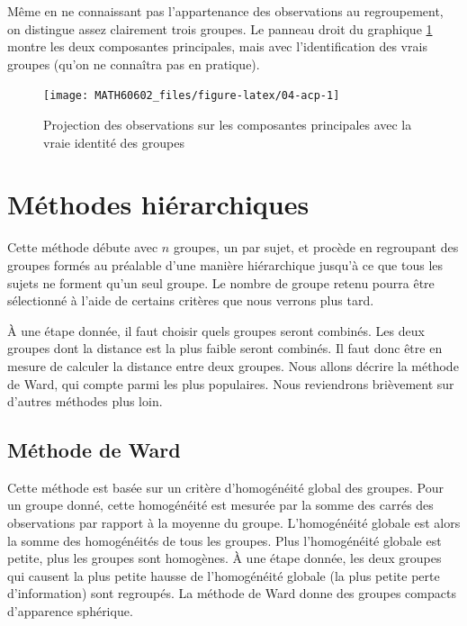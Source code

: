 \documentclass[
  11pt,
  letterpaper,
]{book}
\theoremstyle{definition}
\theoremstyle{definition}
\theoremstyle{definition}
\theoremstyle{remark}
\begin{document}
Même en ne connaissant pas l'appartenance des observations au regroupement, on distingue assez clairement trois groupes. Le panneau droit du graphique \ref{fig:04-acp} montre les deux composantes principales, mais avec l'identification des vrais groupes (qu'on ne connaîtra pas en pratique).

\begin{figure}

{\centering \texttt{[image: MATH60602\_files/figure-latex/04-acp-1]} 

}

\caption{Projection des observations sur les composantes principales avec la vraie identité des groupes}\label{fig:04-acp}
\end{figure}

\hypertarget{muxe9thodes-hiuxe9rarchiques}{%
\section{Méthodes hiérarchiques}\label{muxe9thodes-hiuxe9rarchiques}}

Cette méthode débute avec \(n\) groupes, un par sujet, et procède en regroupant des groupes formés au préalable d'une manière hiérarchique jusqu'à ce que tous les sujets ne forment qu'un seul groupe. Le nombre de groupe retenu pourra être sélectionné à l'aide de certains critères que nous verrons plus tard.

À une étape donnée, il faut choisir quels groupes seront combinés. Les deux groupes dont la distance est la plus faible seront combinés. Il faut donc être en mesure de calculer la distance entre deux groupes. Nous allons décrire la méthode de Ward, qui compte parmi les plus populaires. Nous reviendrons brièvement sur d'autres méthodes plus loin.

\hypertarget{muxe9thode-de-ward}{%
\subsection{Méthode de Ward}\label{muxe9thode-de-ward}}

Cette méthode est basée sur un critère d'homogénéité global des groupes. Pour un groupe donné, cette homogénéité est mesurée par la somme des carrés des observations par rapport à la moyenne du groupe. L'homogénéité globale est alors la somme des homogénéités de tous les groupes. Plus l'homogénéité globale est petite, plus les groupes sont homogènes. À une étape donnée, les deux groupes qui causent la plus petite hausse de l'homogénéité globale (la plus petite perte d'information) sont regroupés. La méthode de Ward donne des groupes compacts d'apparence sphérique.
\end{document}
